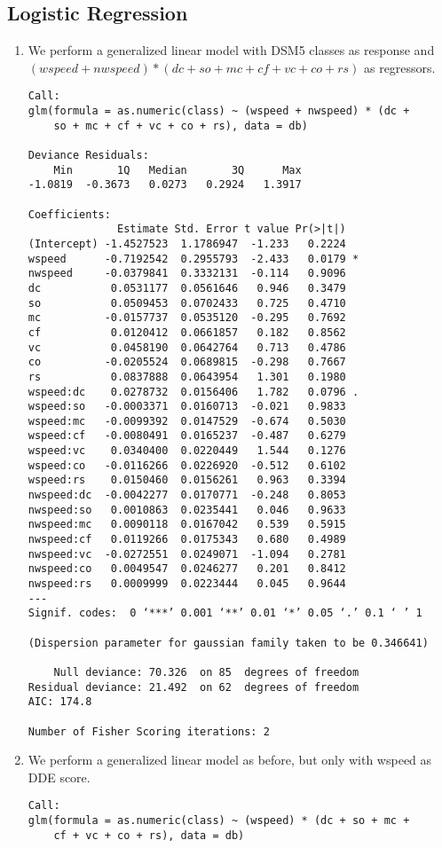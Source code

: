 \documentclass[11pt, a4paper, twoside, openright]{article}
\begin{document}
\subsection{Logistic Regression}
\begin{enumerate}
\item We perform a generalized linear model with DSM5 classes as
  response and $(wspeed+nwspeed)*(dc+so+mc+cf+vc+co+rs)$ as
  regressors.
  \begin{verbatim}
Call:
glm(formula = as.numeric(class) ~ (wspeed + nwspeed) * (dc + 
    so + mc + cf + vc + co + rs), data = db)

Deviance Residuals: 
    Min       1Q   Median       3Q      Max  
-1.0819  -0.3673   0.0273   0.2924   1.3917  

Coefficients:
              Estimate Std. Error t value Pr(>|t|)  
(Intercept) -1.4527523  1.1786947  -1.233   0.2224  
wspeed      -0.7192542  0.2955793  -2.433   0.0179 *
nwspeed     -0.0379841  0.3332131  -0.114   0.9096  
dc           0.0531177  0.0561646   0.946   0.3479  
so           0.0509453  0.0702433   0.725   0.4710  
mc          -0.0157737  0.0535120  -0.295   0.7692  
cf           0.0120412  0.0661857   0.182   0.8562  
vc           0.0458190  0.0642764   0.713   0.4786  
co          -0.0205524  0.0689815  -0.298   0.7667  
rs           0.0837888  0.0643954   1.301   0.1980  
wspeed:dc    0.0278732  0.0156406   1.782   0.0796 .
wspeed:so   -0.0003371  0.0160713  -0.021   0.9833  
wspeed:mc   -0.0099392  0.0147529  -0.674   0.5030  
wspeed:cf   -0.0080491  0.0165237  -0.487   0.6279  
wspeed:vc    0.0340400  0.0220449   1.544   0.1276  
wspeed:co   -0.0116266  0.0226920  -0.512   0.6102  
wspeed:rs    0.0150460  0.0156261   0.963   0.3394  
nwspeed:dc  -0.0042277  0.0170771  -0.248   0.8053  
nwspeed:so   0.0010863  0.0235441   0.046   0.9633  
nwspeed:mc   0.0090118  0.0167042   0.539   0.5915  
nwspeed:cf   0.0119266  0.0175343   0.680   0.4989  
nwspeed:vc  -0.0272551  0.0249071  -1.094   0.2781  
nwspeed:co   0.0049547  0.0246277   0.201   0.8412  
nwspeed:rs   0.0009999  0.0223444   0.045   0.9644  
---
Signif. codes:  0 ‘***’ 0.001 ‘**’ 0.01 ‘*’ 0.05 ‘.’ 0.1 ‘ ’ 1

(Dispersion parameter for gaussian family taken to be 0.346641)

    Null deviance: 70.326  on 85  degrees of freedom
Residual deviance: 21.492  on 62  degrees of freedom
AIC: 174.8

Number of Fisher Scoring iterations: 2
\end{verbatim}
\item We perform a generalized linear model as before, but only with
  wspeed as DDE score.
\begin{verbatim}
Call:
glm(formula = as.numeric(class) ~ (wspeed) * (dc + so + mc + 
    cf + vc + co + rs), data = db)


\end{verbatim}
\end{enumerate}
\end{document}
